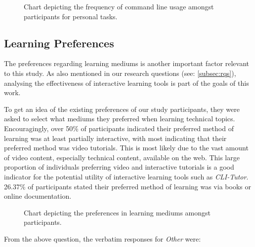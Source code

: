 \begin{figure}[htbp]
	\centering
	\scalebox{0.67}{}
	\caption{Chart depicting the frequency of command line usage amongst participants for personal tasks.}
	\label{fig:often2}
\end{figure}


\FloatBarrier %

\subsection{Learning Preferences}

The preferences regarding learning mediums is another important factor relevant
to this study. As also mentioned in our research questions (see:
\autoref{subsec:rqs}), analysing the effectiveness of interactive learning
tools is part of the goals of this work.

To get an idea of the existing preferences of our study participants, they were
asked to select what mediums they preferred when learning technical topics.
Encouragingly, over 50\% of participants indicated their preferred method of
learning was at least partially interactive, with most indicating that their
preferred method was video tutorials. This is most likely due to the vast
amount of video content, especially technical content, available on the web.
This large proportion of individuals preferring video and interactive tutorials
is a good indicator for the potential utility of interactive learning tools
such as \textit{CLI-Tutor}. 26.37\% of participants stated their preferred
method of learning was via books or online documentation.

\begin{figure}[htbp]
	\centering
	\scalebox{0.67}{}
	\caption{Chart depicting the preferences in learning mediums amongst participants.}
	\label{fig:question}
\end{figure}


From the above question, the verbatim responses for \textit{Other} were:


